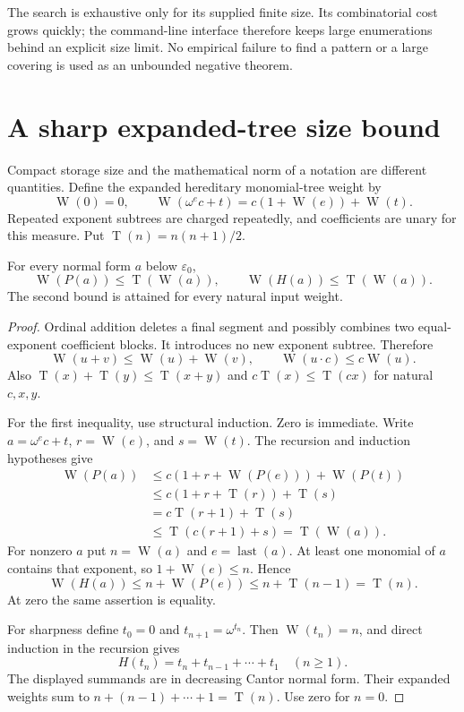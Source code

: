 \documentclass[11pt]{article}
\newcommand{\wt}{\operatorname{W}}
\newcommand{\tri}{\operatorname{T}}
\begin{document}
The search is exhaustive only for its supplied finite size. Its
combinatorial cost grows quickly; the command-line interface therefore
keeps large enumerations behind an explicit size limit. No empirical
failure to find a pattern or a large covering is used as an unbounded
negative theorem.

\section{A sharp expanded-tree size bound}\label{sec:size}

Compact storage size and the mathematical norm of a notation are
different quantities. Define the expanded hereditary monomial-tree
weight by
\begin{equation}\label{eq:weight}
 \wt(0)=0,\qquad
 \wt(\omega^e c+t)=c(1+\wt(e))+\wt(t).
\end{equation}
Repeated exponent subtrees are charged repeatedly, and coefficients are
unary for this measure. Put $\tri(n)=n(n+1)/2$.

\begin{theorem}\label{thm:size}
For every normal form $a$ below $\varepsilon_0$,
\[
 \wt(P(a))\leq\tri(\wt(a)),\qquad
 \wt(H(a))\leq\tri(\wt(a)).
\]
The second bound is attained for every natural input weight.
\end{theorem}

\begin{proof}
Ordinal addition deletes a final segment and possibly combines two
equal-exponent coefficient blocks. It introduces no new exponent
subtree. Therefore
\[
 \wt(u+v)\leq\wt(u)+\wt(v),\qquad
 \wt(u\cdot c)\leq c\wt(u).
\]
Also $\tri(x)+\tri(y)\leq\tri(x+y)$ and
$c\tri(x)\leq\tri(cx)$ for natural $c,x,y$.

For the first inequality, use structural induction. Zero is immediate.
Write $a=\omega^e c+t$, $r=\wt(e)$, and $s=\wt(t)$. The
recursion and induction hypotheses give
\begin{align*}
 \wt(P(a))
 &\leq c(1+r+\wt(P(e)))+\wt(P(t))\\
 &\leq c(1+r+\tri(r))+\tri(s)\\
 &=c\tri(r+1)+\tri(s)\\
 &\leq\tri(c(r+1)+s)=\tri(\wt(a)).
\end{align*}
For nonzero $a$ put $n=\wt(a)$ and $e=\operatorname{last}(a)$.
At least one monomial of $a$ contains that exponent, so
$1+\wt(e)\leq n$. Hence
\[
 \wt(H(a))\leq n+\wt(P(e))
 \leq n+\tri(n-1)=\tri(n).
\]
At zero the same assertion is equality.

For sharpness define $t_0=0$ and $t_{n+1}=\omega^{t_n}$.
Then $\wt(t_n)=n$, and direct induction in the recursion gives
\[
 H(t_n)=t_n+t_{n-1}+\cdots+t_1\quad(n\geq1).
\]
The displayed summands are in decreasing Cantor normal form. Their
expanded weights sum to $n+(n-1)+\cdots+1=\tri(n)$. Use zero
for $n=0$.
\end{proof}
\end{document}
